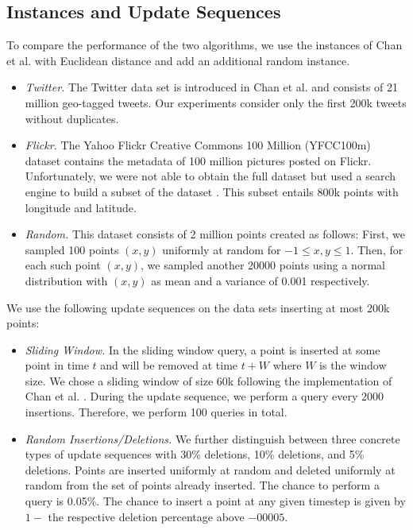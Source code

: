 
    \subsection{Instances and Update Sequences}
To compare the performance of the two algorithms, we use the instances of Chan et al. \cite{hubert2018dynamic} with Euclidean distance and add an additional random instance.

\begin{itemize}
    \item \textit{Twitter.} The Twitter data set \cite{chan2018github} is introduced in Chan et al. \cite{hubert2018dynamic} and consists of 21 million geo-tagged tweets. Our experiments consider only the first 200k tweets without duplicates.

    \item \textit{Flickr.} The Yahoo Flickr Creative Commons 100 Million (YFCC100m) dataset \cite{thomee2015new} contains the metadata of 100 million pictures posted on Flickr. Unfortunately, we were not able to obtain the full dataset but used a search engine to build a subset of the dataset \cite{kalkowski2015yfcc}. This subset entails 800k points with longitude and latitude.

    \item \textit{Random.} This dataset consists of 2 million points created as follows: First, we sampled 100 points $(x, y)$ uniformly at random for $-1 \leq x, y \leq 1$. Then, for each such point $(x, y)$, we sampled another 20000 points using a normal distribution with $(x, y)$ as mean and a variance of 0.001 respectively.
\end{itemize}

    We use the following update sequences on the data sets inserting at most 200k points:
    
    \begin{itemize}
        \item \textit{Sliding Window.} In the sliding window query, a point is inserted at some point in time $t$ and will be removed at time $t + W$ where $W$ is the window size. We chose a sliding window of size 60k following the implementation of Chan et al. \cite{hubert2018dynamic}. During the update sequence, we perform a query every 2000 insertions. Therefore, we perform 100 queries in total.
    
        \item \textit{Random Insertions/Deletions.} We further distinguish between three concrete types of update sequences with 30\% deletions, 10\% deletions, and 5\% deletions. Points are inserted uniformly at random and deleted uniformly at random from the set of points already inserted. The chance to perform a query is 0.05\%. The chance to insert a point at any given timestep is given by $1-$ the respective
        deletion percentage above $-00005$.
    \end{itemize}